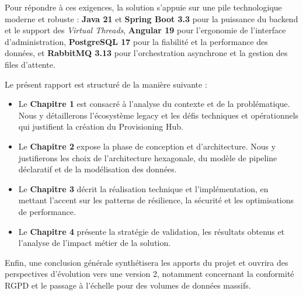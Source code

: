 Pour répondre à ces exigences, la solution s'appuie sur une pile technologique moderne et robuste : \textbf{Java 21} et \textbf{Spring Boot 3.3} pour la puissance du backend et le support des \textit{Virtual Threads}, \textbf{Angular 19} pour l'ergonomie de l'interface d'administration, \textbf{PostgreSQL 17} pour la fiabilité et la performance des données, et \textbf{RabbitMQ 3.13} pour l'orchestration asynchrone et la gestion des files d'attente.

Le présent rapport est structuré de la manière suivante :
\begin{itemize}
    \item Le \textbf{Chapitre 1} est consacré à l'analyse du contexte et de la problématique. Nous y détaillerons l'écosystème legacy et les défis techniques et opérationnels qui justifient la création du Provisioning Hub.
    \item Le \textbf{Chapitre 2} expose la phase de conception et d'architecture. Nous y justifierons les choix de l'architecture hexagonale, du modèle de pipeline déclaratif et de la modélisation des données.
    \item Le \textbf{Chapitre 3} décrit la réalisation technique et l'implémentation, en mettant l'accent sur les patterns de résilience, la sécurité et les optimisations de performance.
    \item Le \textbf{Chapitre 4} présente la stratégie de validation, les résultats obtenus et l'analyse de l'impact métier de la solution.
\end{itemize}
Enfin, une conclusion générale synthétisera les apports du projet et ouvrira des perspectives d'évolution vers une version 2, notamment concernant la conformité RGPD et le passage à l'échelle pour des volumes de données massifs.
